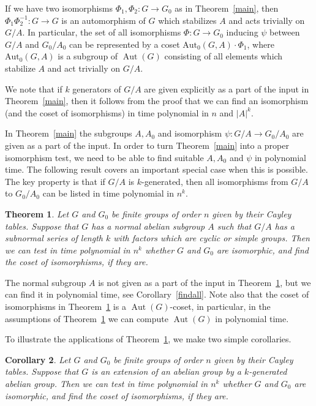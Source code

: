 \documentclass{article}
\newtheorem{theorem}{Theorem}[section]
\newtheorem{corollary}[theorem]{Corollary}
\DeclareMathOperator{\Aut}{Aut}
\begin{document}
If we have two isomorphisms \( \Phi_1, \Phi_2 : G \to G_0 \) as in Theorem~\ref{main}, then
\( \Phi_1 \Phi_2^{-1} : G \to G \) is an automorphism of \( G \) which stabilizes \( A \) and acts trivially on \( G/A \).
In particular, the set of all isomorphisms \( \Phi : G \to G_0 \) inducing \( \psi \) between \( G/A \) and \( G_0/A_0 \)
can be represented by a coset \( \mathrm{Aut}_0(G, A) \cdot \Phi_1 \),
where \( \mathrm{Aut}_0(G, A) \) is a subgroup of \( \Aut(G) \) consisting of all elements which stabilize \( A \) and act trivially on \( G/A \).

We note that if \( k \) generators of \( G/A \) are given explicitly as a part of the input in Theorem~\ref{main},
then it follows from the proof that we can find an isomorphism (and the coset of isomorphisms) in time polynomial in \( n \) and \( |A|^k \).

In Theorem~\ref{main} the subgroups \( A, A_0 \) and isomorphism \( \psi : G/A \to G_0/A_0 \) are given as a part of the input.
In order to turn Theorem~\ref{main} into a proper isomorphism test, we need to be able to find suitable \( A, A_0 \) and \( \psi \) in polynomial time.
The following result covers an important special case when this is possible. The key property is that if \( G/A \) is \( k \)-generated,
then all isomorphisms from \( G/A \) to \( G_0/A_0 \) can be listed in time polynomial in \( n^k \).

\begin{theorem}\label{ctower}
	Let \( G \) and \( G_0 \) be finite groups of order \( n \) given by their Cayley tables.
	Suppose that \( G \) has a normal abelian subgroup \( A \) such that \( G/A \) has a subnormal series
	of length \( k \) with factors which are cyclic or simple groups.
	Then we can test in time polynomial in \( n^k \) whether \( G \) and \( G_0 \) are isomorphic, and find the coset of isomorphisms, if they are.
\end{theorem}

The normal subgroup \( A \) is not given as a part of the input in Theorem~\ref{ctower}, but we can find it in polynomial time, see Corollary~\ref{findall}.
Note also that the coset of isomorphisms in Theorem~\ref{ctower} is a \( \Aut(G) \)-coset, in particular, in the assumptions of Theorem~\ref{ctower}
we can compute \( \Aut(G) \) in polynomial time.

To illustrate the applications of Theorem~\ref{ctower}, we make two simple corollaries.

\begin{corollary}
	Let \( G \) and \( G_0 \) be finite groups of order \( n \) given by their Cayley tables.
	Suppose that \( G \) is an extension of an abelian group by a \( k \)-generated abelian group.
	Then we can test in time polynomial in \( n^k \) whether \( G \) and \( G_0 \) are isomorphic, and find the coset of isomorphisms, if they are.
\end{corollary}
\end{document}
